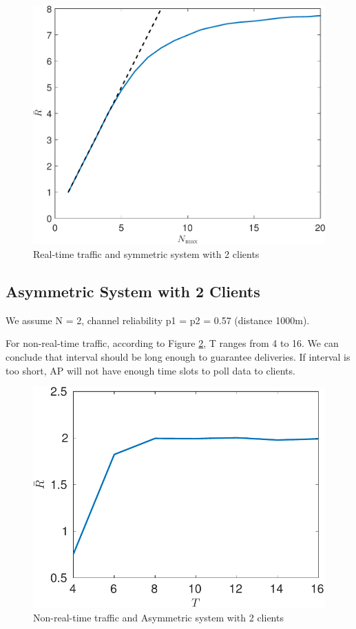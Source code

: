 \documentclass{article}
\begin{document}
\begin{figure}[htbp]
\centering
\includegraphics[scale=0.5]{realtime_throughput_randmax.pdf}
\caption{Real-time traffic and symmetric system with 2 clients}
\label{realtime_throughput_randmax}
\end{figure}

\subsection{Asymmetric System with 2 Clients}
We assume N = 2, channel reliability p1 = p2 = 0.57 (distance 1000m).

For non-real-time traffic, according to Figure \ref{nonrealtime_throughput_T}, T ranges from 4 to 16. We can conclude that interval should be long enough to guarantee deliveries. If interval is too short, AP will not have enough time slots to poll data to clients. 

\begin{figure}[htbp]
\centering
\includegraphics[scale=0.7]{nonrealtime_throughput_T.pdf}
\caption{Non-real-time traffic and Asymmetric system with 2 clients}
\label{nonrealtime_throughput_T}
\end{figure}
\end{document}
